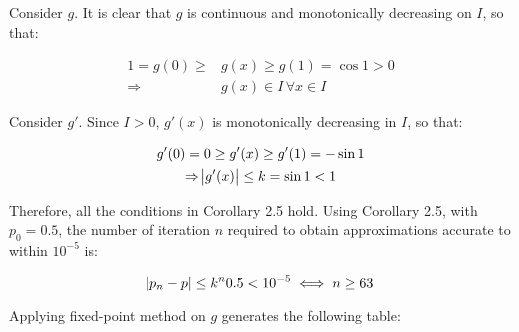 \documentclass[../../../../Assignments]{subfiles}
\begin{document}
\begin{solution}
\begin{enumerate}[label = \alph*)]
            Consider \(g\). It is clear that \(g\) is continuous and
            monotonically decreasing on \(I\), so that:

            \begin{align*}
                1 = g(0) \geq &g(x) \geq g(1) = \cos{1} > 0  \\
                  \Rightarrow &g(x) \in I \, \forall x \in I
            \end{align*}

            Consider \(g'\). Since \(I > 0\), \(g'(x)\) is monotonically
            decreasing in \(I\), so that:

            \begin{gather*}
                g'(0) = 0 \geq g'(x) \geq g'(1) = - \sin{1} \\
                \Rightarrow \abs{g'(x)} \leq k = \sin{1} < 1
            \end{gather*}

            Therefore, all the conditions in Corollary 2.5 hold. Using Corollary
            2.5, with \(p_0 = \num{0.5}\), the number of iteration \(n\)
            required to obtain approximations accurate to within \(10^{-5}\) is:

            \[\abs{p_n - p} \leq k^n \num{0.5} < 10^{-5} \iff n \geq 63\]

            Applying fixed-point method on \(g\) generates the following table:


\end{enumerate}
\end{solution}
\end{document}
